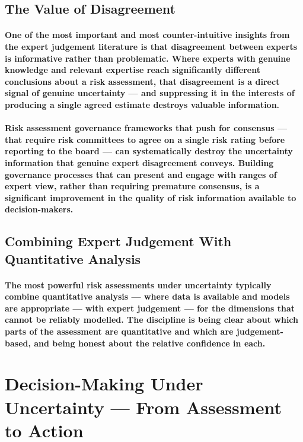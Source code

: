 \subsection{The Value of Disagreement}
\paragraph{One of the most important and most counter-intuitive insights from the expert judgement literature is that \textbf{disagreement between experts is informative rather than problematic}. Where experts with genuine knowledge and relevant expertise reach significantly different conclusions about a risk assessment, that disagreement is a direct signal of genuine uncertainty — and suppressing it in the interests of producing a single agreed estimate destroys valuable information.}
\paragraph{Risk assessment governance frameworks that push for consensus — that require risk committees to agree on a single risk rating before reporting to the board — can systematically destroy the uncertainty information that genuine expert disagreement conveys. Building governance processes that can present and engage with ranges of expert view, rather than requiring premature consensus, is a significant improvement in the quality of risk information available to decision-makers.}

\subsection{Combining Expert Judgement With Quantitative Analysis}
\paragraph{The most powerful risk assessments under uncertainty typically combine quantitative analysis — where data is available and models are appropriate — with expert judgement — for the dimensions that cannot be reliably modelled. The discipline is being clear about which parts of the assessment are quantitative and which are judgement-based, and being honest about the relative confidence in each.}

\section{Decision-Making Under Uncertainty — From Assessment to Action}
